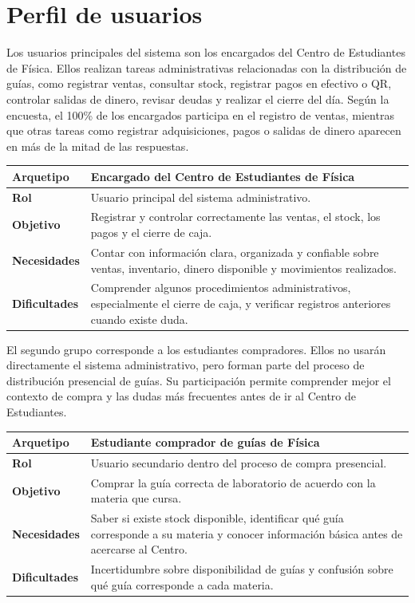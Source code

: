 \documentclass[12pt,letterpaper]{article}
\begin{document}
\section{Perfil de usuarios}

Los usuarios principales del sistema son los encargados del Centro de Estudiantes de Física. Ellos realizan tareas administrativas relacionadas con la distribución de guías, como registrar ventas, consultar stock, registrar pagos en efectivo o QR, controlar salidas de dinero, revisar deudas y realizar el cierre del día. Según la encuesta, el 100\% de los encargados participa en el registro de ventas, mientras que otras tareas como registrar adquisiciones, pagos o salidas de dinero aparecen en más de la mitad de las respuestas.

\begin{center}
\begin{tabularx}{\textwidth}{|>{\bfseries}p{4cm}|X|}
\hline
Arquetipo & Encargado del Centro de Estudiantes de Física \\
\hline
Rol & Usuario principal del sistema administrativo. \\
\hline
Objetivo & Registrar y controlar correctamente las ventas, el stock, los pagos y el cierre de caja. \\
\hline
Necesidades & Contar con información clara, organizada y confiable sobre ventas, inventario, dinero disponible y movimientos realizados. \\
\hline
Dificultades & Comprender algunos procedimientos administrativos, especialmente el cierre de caja, y verificar registros anteriores cuando existe duda. \\
\hline
\end{tabularx}
\end{center}

El segundo grupo corresponde a los estudiantes compradores. Ellos no usarán directamente el sistema administrativo, pero forman parte del proceso de distribución presencial de guías. Su participación permite comprender mejor el contexto de compra y las dudas más frecuentes antes de ir al Centro de Estudiantes.

\begin{center}
\begin{tabularx}{\textwidth}{|>{\bfseries}p{4cm}|X|}
\hline
Arquetipo & Estudiante comprador de guías de Física \\
\hline
Rol & Usuario secundario dentro del proceso de compra presencial. \\
\hline
Objetivo & Comprar la guía correcta de laboratorio de acuerdo con la materia que cursa. \\
\hline
Necesidades & Saber si existe stock disponible, identificar qué guía corresponde a su materia y conocer información básica antes de acercarse al Centro. \\
\hline
Dificultades & Incertidumbre sobre disponibilidad de guías y confusión sobre qué guía corresponde a cada materia. \\
\hline
\end{tabularx}
\end{center}
\end{document}
